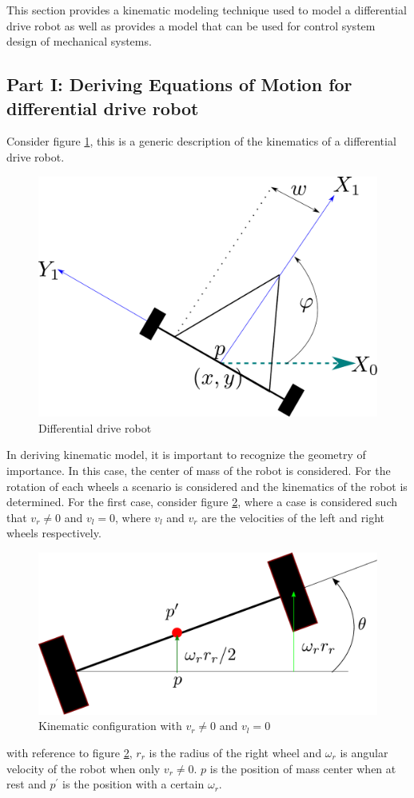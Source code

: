 This section provides a kinematic modeling technique used to model a differential drive robot as well as provides a model that can be used for control system design of mechanical systems.

\subsection{Part I: Deriving Equations of Motion for differential drive robot}

Consider figure \ref{Fig_DD_Robot}, this is a generic description of the kinematics of a differential drive robot.
\newpage
\begin{figure}[h!]
	\centering
	\includegraphics[width=0.5\linewidth]{Bilder/DifferentialDriveRobot.pdf}
	\caption{Differential drive robot}
	\label{Fig_DD_Robot}
\end{figure}
In deriving kinematic model, it is important to recognize the geometry of importance. In this case, the center of mass of the robot is considered. For the rotation of each wheels a scenario is considered and the kinematics of the robot is determined. For the first case, consider figure \ref{fig_2_ch_3_KD_DR_1}, where a case is considered such that $v_r \neq 0$ and $v_l = 0$, where $v_l$ and $v_r$ are the velocities of the left and right wheels respectively.
\begin{figure}[h!]
	\centering
	\includegraphics[width=0.4\linewidth]{Bilder/30_DifferentialRobot2.pdf}
	\caption{Kinematic configuration with $v_r \neq 0$ and $v_l = 0$}
	\label{fig_2_ch_3_KD_DR_1}
\end{figure}
with reference to figure \ref{fig_2_ch_3_KD_DR_1}, $r_r$ is the radius of the right wheel and $\omega_{r}$ is angular velocity of the robot when only $v_r \neq 0$. $p$ is the position of mass center when at rest and $p^{\prime}$ is the position with a certain $\omega_{r}$.

